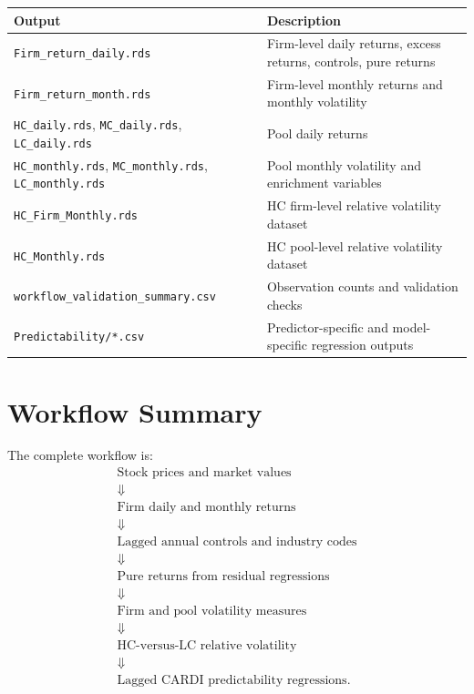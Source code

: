 \documentclass[11pt]{article}
\begin{document}
\begin{longtable}{p{}p{}}
\toprule
Output & Description\\
\midrule
\texttt{Firm\_return\_daily.rds} & Firm-level daily returns, excess returns, controls, pure returns\\
\texttt{Firm\_return\_month.rds} & Firm-level monthly returns and monthly volatility\\
\texttt{HC\_daily.rds}, \texttt{MC\_daily.rds}, \texttt{LC\_daily.rds} & Pool daily returns\\
\texttt{HC\_monthly.rds}, \texttt{MC\_monthly.rds}, \texttt{LC\_monthly.rds} & Pool monthly volatility and enrichment variables\\
\texttt{HC\_Firm\_Monthly.rds} & HC firm-level relative volatility dataset\\
\texttt{HC\_Monthly.rds} & HC pool-level relative volatility dataset\\
\texttt{workflow\_validation\_summary.csv} & Observation counts and validation checks\\
\texttt{Predictability/*.csv} & Predictor-specific and model-specific regression outputs\\
\bottomrule
\end{longtable}

\section{Workflow Summary}

The complete workflow is:
\[
\begin{array}{c}
\text{Stock prices and market values}\\
\Downarrow\\
\text{Firm daily and monthly returns}\\
\Downarrow\\
\text{Lagged annual controls and industry codes}\\
\Downarrow\\
\text{Pure returns from residual regressions}\\
\Downarrow\\
\text{Firm and pool volatility measures}\\
\Downarrow\\
\text{HC-versus-LC relative volatility}\\
\Downarrow\\
\text{Lagged CARDI predictability regressions}.
\end{array}
\]
\end{document}
